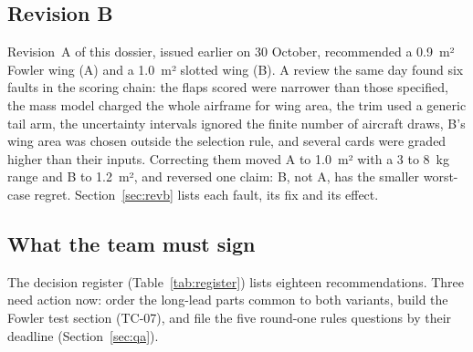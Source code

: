 \subsection{Revision B}
Revision~A of this dossier, issued earlier on 30 October, recommended a 0.9~m² Fowler wing (A) and a 1.0~m² slotted wing (B). A review the same day found six faults in the scoring chain: the flaps scored were narrower than those specified, the mass model charged the whole airframe for wing area, the trim used a generic tail arm, the uncertainty intervals ignored the finite number of aircraft draws, B's wing area was chosen outside the selection rule, and several cards were graded higher than their inputs. Correcting them moved A to 1.0~m² with a 3 to 8~kg range and B to 1.2~m², and reversed one claim: B, not A, has the smaller worst-case regret. Section~\ref{sec:revb} lists each fault, its fix and its effect.

\subsection{What the team must sign}
The decision register (Table~\ref{tab:register}) lists eighteen recommendations. Three need action now: order the long-lead parts common to both variants, build the Fowler test section (TC-07), and file the five round-one rules questions by their deadline (Section~\ref{sec:qa}).
